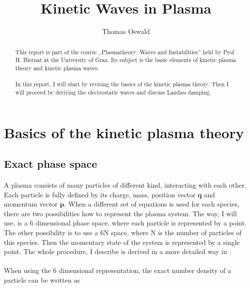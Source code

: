 \documentclass[a4paper,10pt]{report}
\title{Kinetic Waves in Plasma}
\author{Thomas Oswald}
\begin{document}
\maketitle
\tableofcontents

\begin{abstract}
\paragraph*{}
This report is part of the course ,,Plasmatheory: Waves and Instabilities'' held by Prof. H. Biernat at the University of Graz. Its subject is the basic elements of kinetic plasma theory and kinetic plasma waves.


\paragraph*{}
In this report, I will start by revising the basics of the kinetic plasma theory. Then I will proceed by deriving the electrostatic waves and discuss Landau damping.
\end{abstract}


\section{Basics of the kinetic plasma theory}
\subsection{Exact phase space}


\paragraph*{}
A plasma consists of many particles of different kind, interacting with each other. Each particle is fully defined by its charge, mass, position vector $\mathbf{q}$ and momentum vector $\mathbf{p}$. When a different set of equations is used for each species, there are two possibilities how to represent the plasma system. The way, I will use, is a 6 dimensional phase space, where each particle is represented by a point. The other possibility is to use a 6N space, where N is the number of particles of this species. Then the momentary state of the system is represented by a single point. The whole procedure, I describe is derived in a more detailed way in \cite{baumjohann1}.

\paragraph*{}
When using the 6 dimensional representation, the exact number density of a particle can be written as
\end{document}

